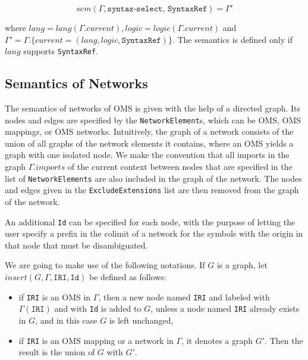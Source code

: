 \documentclass[10pt,fleqn,%
\ifpretendfinal
final%
\else
draft%
\fi,
]{scrreprt}
\newcommand*{\syntax}[1]{\texttt{#1}}
\newcommand{\semdom}[1]{
\begin{center}
\fbox{$#1$}
\end{center}
}
\newcommand{\current}{\mathit{current}}
\newcommand{\ssclause}[1]{\subsection{#1}}
\begin{document}
$$sem(\Gamma,\syntax{syntax-select, SyntaxRef})=\Gamma'$$

\noindent where $lang = lang(\Gamma.\current), logic = logic(\Gamma.\current)$ and\\
$\Gamma'  = \Gamma.\{\current = (lang, logic, \syntax{SyntaxRef})\}$. 
The semantics is defined only if $\mathit{lang}$ supports \syntax{SyntaxRef}.

%

%

\ssclause{Semantics of Networks}

The semantics of networks of OMS is given with the help of a directed graph. Its nodes
and edges are specified by the \syntax{NetworkElement}s, which can be OMS, OMS mappings, or OMS networks. Intuitively, the graph of a
network consists of the union of all graphs of the network elements it
contains, where an OMS yields a graph with one isolated node. We make the convention that
all imports in the graph $\Gamma.imports$ of the current context between nodes that are
specified in the list of \syntax{NetworkElements} are also included in the graph of 
the network. 
The nodes and edges given in the \syntax{ExcludeExtensions} list are then removed from the graph of the network. 

An additional \syntax{Id} can be specified for each node, with the purpose of letting the user specify a 
prefix in the colimit of a network for the symbols with the origin in that node that must be disambiguated.

We are going to make use of the following notations. If $G$ is a graph, let $insert(G, \Gamma, \syntax{IRI}, \syntax{Id})$ be defined as follows:
 \begin{itemize}
    \item if \syntax{IRI} is an OMS in $\Gamma$, then
                 a new node named \syntax{IRI} and labeled with $\Gamma(\syntax{IRI})$ and with \syntax{Id} is added to $G$,
                 unless a node named \syntax{IRI} already exists in $G$, and in this case $G$ is left unchanged,
   \item if \syntax{IRI} is an OMS mapping 
      or a network in $\Gamma$, it denotes a graph $G'$. Then
      the result is the union of $G$ with $G'$.
 \end{itemize}
 
\end{document}
